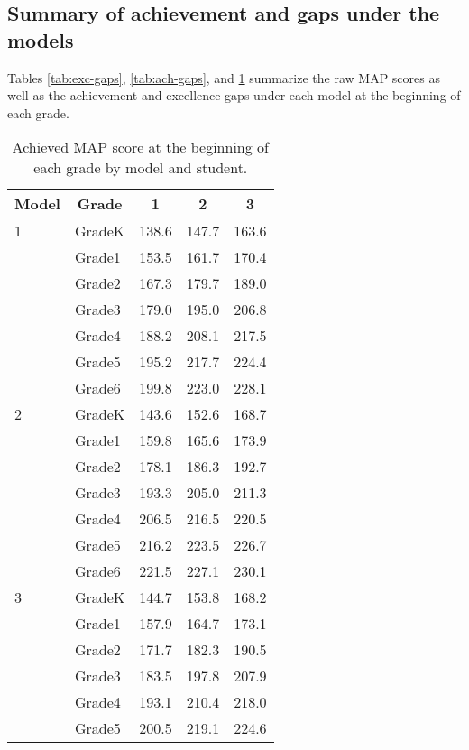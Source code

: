 \documentclass[english,floatsintext,jou]{apa6}
\theoremstyle{definition}
\theoremstyle{definition}
\theoremstyle{definition}
\theoremstyle{remark}
\begin{document}
\subsection{Summary of achievement and gaps under the
models}\label{summary-of-achievement-and-gaps-under-the-models}

Tables \ref{tab:exc-gaps}, \ref{tab:ach-gaps}, and \ref{tab:ach-long}
summarize the raw MAP scores as well as the achievement and excellence
gaps under each model at the beginning of each grade.

\begin{table}[tbp]
\begin{center}
\begin{threeparttable}
\caption{\label{tab:ach-long}Achieved MAP score at the beginning of each grade by model and student.}
\small{
\begin{tabular}{lllll}
\toprule
Model & \multicolumn{1}{c}{Grade} & \multicolumn{1}{c}{1} & \multicolumn{1}{c}{2} & \multicolumn{1}{c}{3}\\
\midrule
1 & GradeK & 138.6 & 147.7 & 163.6\\
 & Grade1 & 153.5 & 161.7 & 170.4\\
 & Grade2 & 167.3 & 179.7 & 189.0\\
 & Grade3 & 179.0 & 195.0 & 206.8\\
 & Grade4 & 188.2 & 208.1 & 217.5\\
 & Grade5 & 195.2 & 217.7 & 224.4\\
 & Grade6 & 199.8 & 223.0 & 228.1\\ \midrule
2 & GradeK & 143.6 & 152.6 & 168.7\\
 & Grade1 & 159.8 & 165.6 & 173.9\\
 & Grade2 & 178.1 & 186.3 & 192.7\\
 & Grade3 & 193.3 & 205.0 & 211.3\\
 & Grade4 & 206.5 & 216.5 & 220.5\\
 & Grade5 & 216.2 & 223.5 & 226.7\\
 & Grade6 & 221.5 & 227.1 & 230.1\\ \midrule
3 & GradeK & 144.7 & 153.8 & 168.2\\
 & Grade1 & 157.9 & 164.7 & 173.1\\
 & Grade2 & 171.7 & 182.3 & 190.5\\
 & Grade3 & 183.5 & 197.8 & 207.9\\
 & Grade4 & 193.1 & 210.4 & 218.0\\
 & Grade5 & 200.5 & 219.1 & 224.6\\

\end{tabular}}
\end{threeparttable}
\end{center}
\end{table}
\end{document}
